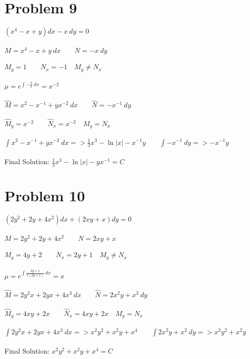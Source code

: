 \documentclass[12pt]{exam}
\begin{document}
\section*{Problem 9}
$(x^4-x+y)dx-x\:dy=0$\\\\
$M=x^4-x+y\:dx\qquad N=-x\:dy$\\\\
$M_y=1\qquad N_x=-1\quad M_y\neq N_x$\\\\
$\mu=e^{\int-\frac{2}{x}\:dx}=x^{-2}$\\\\
$\hat{M}=x^2-x^{-1}+yx^{-2}\:dx\qquad \hat{N}=-x^{-1}\:dy$\\\\
$\hat{M}_y=x^{-2}\qquad \hat{N}_x=x^{-2}\quad M_y=N_x$\\\\
$\int x^2-x^{-1}+yx^{-2}\:dx=>\frac{1}{3}x^3-\ln{|x|}-x^{-1}y\qquad\int -x^{-1}\:dy=>-x^{-1}y$\\\\
Final Solution: $\frac{1}{3}x^3-\ln{|x|}-yx^{-1}=C$
\section*{Problem 10}
$(2y^2+2y+4x^2)dx+(2xy+x)dy=0$\\\\
$M=2y^2+2y+4x^2\qquad N=2xy+x$\\\\
$M_y=4y+2\qquad N_x=2y+1\quad M_y\neq N_x$\\\\
$\mu=e^{\int\frac{2y+1}{x(2y+1)}\:dx}=x$\\\\
$\hat{M}=2y^2x+2yx+4x^3\:dx\qquad \hat{N}=2x^2y+x^2\:dy$\\\\
$\hat{M}_y=4xy+2x\qquad \hat{N}_x=4xy+2x\quad M_y=N_x$\\\\
$\int 2y^2x+2yx+4x^3\:dx=>x^2y^2+x^2y+x^4\qquad\int 2x^2y+x^2\:dy=>x^2y^2+x^2y$\\\\
Final Solution: $x^2y^2+x^2y+x^4=C$
\end{document}
